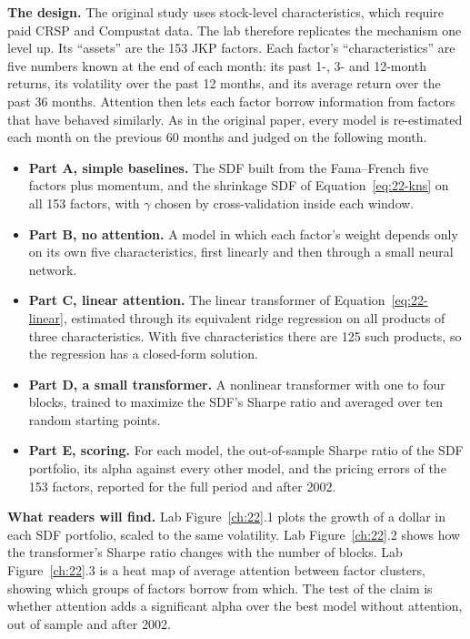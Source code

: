 \textbf{The design.} The original study uses stock-level characteristics, which require paid CRSP and Compustat data. The lab therefore replicates the mechanism one level up. Its ``assets'' are the 153 JKP factors. Each factor's ``characteristics'' are five numbers known at the end of each month: its past 1-, 3- and 12-month returns, its volatility over the past 12 months, and its average return over the past 36 months. Attention then lets each factor borrow information from factors that have behaved similarly. As in the original paper, every model is re-estimated each month on the previous 60 months and judged on the following month.

\begin{itemize}
  \item \textbf{Part A, simple baselines.} The SDF built from the Fama--French five factors plus momentum, and the shrinkage SDF of Equation~\eqref{eq:22-kns} on all 153 factors, with $\gamma$ chosen by cross-validation inside each window.
  \item \textbf{Part B, no attention.} A model in which each factor's weight depends only on its own five characteristics, first linearly and then through a small neural network.
  \item \textbf{Part C, linear attention.} The linear transformer of Equation~\eqref{eq:22-linear}, estimated through its equivalent ridge regression on all products of three characteristics. With five characteristics there are 125 such products, so the regression has a closed-form solution.
  \item \textbf{Part D, a small transformer.} A nonlinear transformer with one to four blocks, trained to maximize the SDF's Sharpe ratio and averaged over ten random starting points.
  \item \textbf{Part E, scoring.} For each model, the out-of-sample Sharpe ratio of the SDF portfolio, its alpha against every other model, and the pricing errors of the 153 factors, reported for the full period and after 2002.
\end{itemize}

\textbf{What readers will find.} Lab Figure~\ref{ch:22}.1 plots the growth of a dollar in each SDF portfolio, scaled to the same volatility. Lab Figure~\ref{ch:22}.2 shows how the transformer's Sharpe ratio changes with the number of blocks. Lab Figure~\ref{ch:22}.3 is a heat map of average attention between factor clusters, showing which groups of factors borrow from which. The test of the claim is whether attention adds a significant alpha over the best model without attention, out of sample and after 2002.

